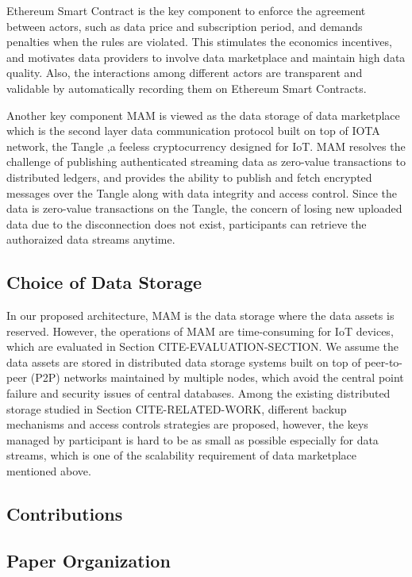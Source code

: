 \documentclass[conference]{IEEEtran}
\begin{document}
Ethereum Smart Contract is the key component to enforce the agreement between actors, such as data price and subscription period, and demands penalties when the rules are violated. This stimulates the economics incentives, and motivates data providers to involve data marketplace and maintain high data quality. Also, the interactions among different actors are transparent and validable by automatically recording them on Ethereum Smart Contracts. 

Another key component MAM is viewed as the data storage of data marketplace which is the second layer data communication protocol built on top of IOTA\cite{IOTAwhitepaper} network, the Tangle ,a feeless cryptocurrency designed for IoT. MAM resolves the challenge of publishing authenticated streaming data as zero-value transactions to distributed ledgers, and provides the ability to publish and fetch encrypted messages over the Tangle along with data integrity and access control. Since the data is zero-value transactions on the Tangle, the concern of losing new uploaded data due to the  disconnection does not exist, participants can retrieve the authoraized data streams anytime. 

\subsection{Choice of Data Storage}
In our proposed architecture, MAM is the data storage where the data assets is reserved. However, the operations of MAM are time-consuming for IoT devices, which are evaluated in Section CITE-EVALUATION-SECTION. We assume the data assets are stored in distributed data storage systems built on top of peer-to-peer (P2P) networks maintained by multiple nodes, which avoid the central point failure and security issues of central databases. Among the existing distributed storage studied in Section CITE-RELATED-WORK, different backup mechanisms and access controls strategies are proposed, however, the keys managed by participant is hard to be as small as possible especially for data streams, which is one of the scalability requirement of data marketplace mentioned above.  



\subsection{Contributions}

\subsection{Paper Organization}
\end{document}
